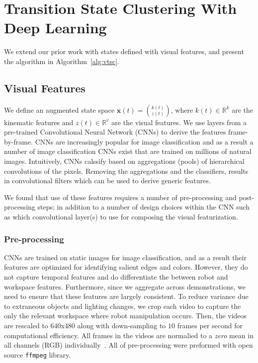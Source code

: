 \documentclass[0-main.tex]{subfiles}
\begin{document}
\section{Transition State Clustering With Deep Learning}
\label{sec:vtsc}
We extend our prior work with states defined with visual features, and present the \tsc algorithm in Algorithm~\ref{alg:vtsc}.

\subsection{Visual Features}
We define an augmented state space $\mathbf{x}(t) = \binom{k(t)}{z(t)}$, where $k(t) \in \mathbb{R}^k$ are the kinematic features and $z(t) \in \mathbb{R}^v$ are the visual features.
We use layers from a pre-trained Convolutional Neural Network (CNNs) to derive the features frame-by-frame.
CNNs are increasingly popular for image classification and as a result a number of image classification CNNs exist that are trained on millions of natural images.
Intuitively, CNNs calssify based on aggregations (pools) of hierarchical convolutions of the pixels. Removing the aggregations and the classifiers, results in convolutional filters which can be used to derive generic features.

We found that use of these features requires a number of pre-processing and post-processing steps; in addition to a number of design choices within the CNN such as which convolutional layer(s) to use for composing the visual featurization.

\subsubsection{Pre-processing}
CNNs are trained on static images for image classification, and as a result their features are optimized for identifying salient edges and colors. However, they do not capture temporal features and do differentiate the between robot and workspace features.
Furthermore, since we aggregate across demonstrations, we need to ensure that these features are largely consistent. 
To reduce variance due to extraneous objects and lighting changes, we crop each video to capture the only the relevant workspace where robot manipulation occurs.
Then, the videos are rescaled to $640$x$480$ along with down-sampling to $10$ frames per second for computational efficiency. 
 All frames in the videos are normalied to a \textit{zero} mean in all channels (RGB) individually~\cite{krizhevsky2012imagenet,simonyan2014very}. All of pre-processing were preformed with open source \texttt{ffmpeg} library.
\end{document}
